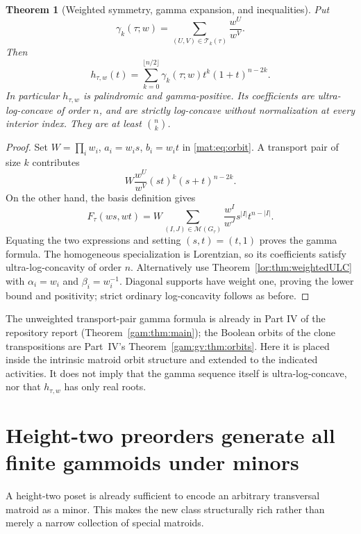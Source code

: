 \documentclass[11pt]{article}
\numberwithin{equation}{section}
\newtheorem{theorem}{Theorem}[section]
\theoremstyle{definition}
\newcommand{\PM}{\mathcal M}
\newcommand{\Tset}{\mathcal T}
\begin{document}
\begin{theorem}[Weighted symmetry, gamma expansion, and inequalities]
\label{mat:thm:weighted-preorder}
Put
\[
 \gamma_k(\tau;w)=\sum_{(U,V)\in\Tset_k(\tau)}\frac{w^U}{w^V}.
\]
Then
\begin{equation}
 \boxed{\quad h_{\tau,w}(t)=
 \sum_{k=0}^{\lfloor n/2\rfloor}\gamma_k(\tau;w)
                       t^k(1+t)^{n-2k}.\quad}
\label{mat:eq:weighted-gamma}
\end{equation}
In particular $h_{\tau,w}$ is palindromic and gamma-positive. Its
coefficients are ultra-log-concave of order $n$, and are strictly
log-concave without normalization at every interior index. They are at
least $\binom nk$.
\end{theorem}
\begin{proof}
Set $W=\prod_iw_i$, $a_i=w_i s$, $b_i=w_i t$ in
\eqref{mat:eq:orbit}. A transport pair of size $k$ contributes
\[
 W\frac{w^U}{w^V}(st)^k(s+t)^{n-2k}.
\]
On the other hand, the basis definition gives
\[
 F_\tau(ws,wt)=W\sum_{(I,J)\in\PM(G_\tau)}
                   \frac{w^I}{w^J}s^{|I|}t^{n-|I|}.
\]
Equating the two expressions and setting $(s,t)=(t,1)$ proves the gamma
formula. The homogeneous specialization is Lorentzian, so its coefficients
satisfy ultra-log-concavity of order $n$. Alternatively use
Theorem~\ref{lor:thm:weightedULC} with $\alpha_i=w_i$ and
$\beta_i=w_i^{-1}$. Diagonal supports have weight one, proving the lower
bound and positivity; strict ordinary log-concavity follows as before.
\end{proof}

The unweighted transport-pair gamma formula is already in Part IV of the
repository report (Theorem~\ref{gam:thm:main}); the Boolean orbits of the clone
transpositions are Part~IV's Theorem~\ref{gam:gv:thm:orbits}. Here it is placed inside the intrinsic matroid orbit
structure and extended to the indicated activities. It does not imply that
the gamma sequence itself is ultra-log-concave, nor that $h_{\tau,w}$ has
only real roots.

\section{Height-two preorders generate all finite gammoids under minors}
\label{mat:sec:universality}
A height-two poset is already sufficient to encode an arbitrary transversal
matroid as a minor. This makes the new class structurally rich rather than
merely a narrow collection of special matroids.
\end{document}
